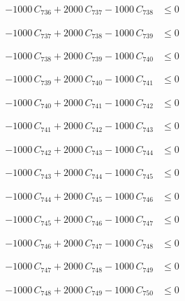 \documentclass[a4paper,11pt]{article}
\begin{document}
\begin{align}
-1000\,C_{736} + 2000\,C_{737} - 1000\,C_{738} &\leq 0 \nonumber
\end{align}

\begin{align}
-1000\,C_{737} + 2000\,C_{738} - 1000\,C_{739} &\leq 0 \nonumber
\end{align}

\begin{align}
-1000\,C_{738} + 2000\,C_{739} - 1000\,C_{740} &\leq 0 \nonumber
\end{align}

\begin{align}
-1000\,C_{739} + 2000\,C_{740} - 1000\,C_{741} &\leq 0 \nonumber
\end{align}

\begin{align}
-1000\,C_{740} + 2000\,C_{741} - 1000\,C_{742} &\leq 0 \nonumber
\end{align}

\begin{align}
-1000\,C_{741} + 2000\,C_{742} - 1000\,C_{743} &\leq 0 \nonumber
\end{align}

\begin{align}
-1000\,C_{742} + 2000\,C_{743} - 1000\,C_{744} &\leq 0 \nonumber
\end{align}

\begin{align}
-1000\,C_{743} + 2000\,C_{744} - 1000\,C_{745} &\leq 0 \nonumber
\end{align}

\begin{align}
-1000\,C_{744} + 2000\,C_{745} - 1000\,C_{746} &\leq 0 \nonumber
\end{align}

\begin{align}
-1000\,C_{745} + 2000\,C_{746} - 1000\,C_{747} &\leq 0 \nonumber
\end{align}

\begin{align}
-1000\,C_{746} + 2000\,C_{747} - 1000\,C_{748} &\leq 0 \nonumber
\end{align}

\begin{align}
-1000\,C_{747} + 2000\,C_{748} - 1000\,C_{749} &\leq 0 \nonumber
\end{align}

\begin{align}
-1000\,C_{748} + 2000\,C_{749} - 1000\,C_{750} &\leq 0 \nonumber
\end{align}
\end{document}
